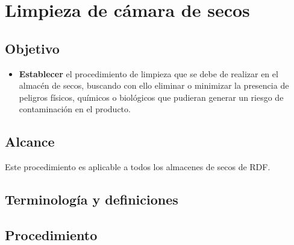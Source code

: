 \thispagestyle{formato-PI}
\renewcommand{\MayorVer}{2}
\renewcommand{\MenorVer}{0}
\renewcommand{\Titulo}{Limpieza de cámara de secos}
\renewcommand{\Codigo}{HYS-2-IT}
\renewcommand{\FechaPub}{2023--01}

\section{\Titulo}


\subsection{Objetivo}

\begin{itemize}
	\item \textbf{Establecer} el procedimiento de limpieza que se debe de realizar en el almacén de secos, buscando con ello eliminar o minimizar la presencia de peligros físicos, químicos o biológicos que pudieran generar un riesgo de contaminación en el producto.
\end{itemize}

\subsection{Alcance}

Este procedimiento es aplicable a todos los almacenes de secos de \gls{RDF}.

\subsection{Terminología y definiciones}

\begin{description}
\end{description}


\subsection{Procedimiento}
